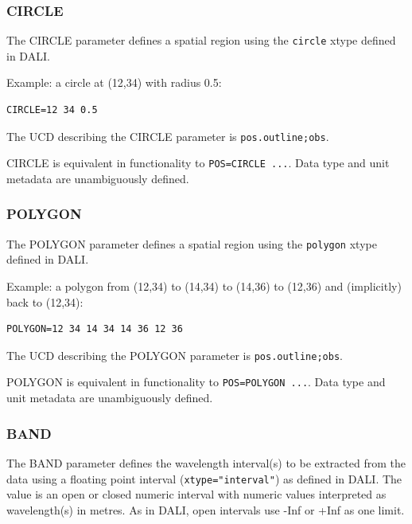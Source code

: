 \documentclass[11pt,a4paper]{ivoa}
\newcommand{\xtype}[1]{\texttt{#1}}
\newcommand{\ucd}[1]{\texttt{#1}}
\begin{document}
\subsubsection{CIRCLE} 
\label{sec:CIRCLE}

The CIRCLE parameter defines a spatial region using the \xtype{circle}
xtype defined in DALI.

Example: a circle at (12,34) with radius 0.5:

\begin{lstlisting}
CIRCLE=12 34 0.5
\end{lstlisting}

The UCD describing the CIRCLE parameter is
\ucd{pos.outline;obs}.

CIRCLE is equivalent in functionality  to \texttt{POS=CIRCLE ...}.  Data type  and unit metadata are unambiguously defined.

\subsubsection{POLYGON}
\label{sec:POLYGON}

The POLYGON parameter defines a spatial region using the \xtype{polygon}
xtype defined in DALI.

Example: a  polygon from (12,34) to (14,34) to (14,36) to (12,36) and
(implicitly) back to (12,34):

\begin{lstlisting}
POLYGON=12 34 14 34 14 36 12 36
\end{lstlisting}

The UCD describing the POLYGON parameter is
\ucd{pos.outline;obs}.

POLYGON is equivalent in functionality to \texttt{POS=POLYGON ...}.  Data type  and unit metadata are unambiguously defined.


\subsubsection{BAND}
\label{sec:BAND}

The BAND parameter defines the wavelength interval(s) to be extracted from
the data using a floating point interval (\verb|xtype="interval"|) as
defined in DALI.  The value is an open or closed numeric
interval with numeric values interpreted as wavelength(s) in metres. As
in DALI, open intervals use -Inf or +Inf as one limit.
\end{document}
